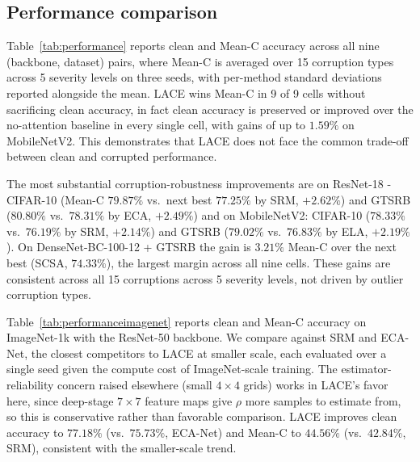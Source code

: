 \documentclass{bmvc2k}
\begin{document}

\subsection{Performance comparison}

Table~\ref{tab:performance} reports clean and Mean-C accuracy across all nine (backbone, dataset) pairs, where Mean-C is averaged over 15 corruption types across 5 severity levels on three seeds, with per-method standard deviations reported alongside the mean. LACE wins Mean-C in 9 of 9 cells without sacrificing clean accuracy, in fact clean accuracy is preserved or improved over the no-attention baseline in every single cell, with gains of up to $1.59\%$ on MobileNetV2. This demonstrates that LACE does not face the common trade-off between clean and corrupted performance.

The most substantial corruption-robustness improvements are on ResNet-18 - CIFAR-10 (Mean-C $79.87\%$ vs.\ next best $77.25\%$ by SRM, $+2.62\%$) and GTSRB ($80.80\%$ vs.\ $78.31\%$ by ECA, $+2.49\%$) and on MobileNetV2: CIFAR-10 ($78.33\%$ vs.\ $76.19\%$ by SRM, $+2.14\%$) and GTSRB ($79.02\%$ vs.\ $76.83\%$ by ELA, $+2.19\%$). On DenseNet-BC-100-12 + GTSRB the gain is $3.21\%$ Mean-C over the next best (SCSA, $74.33\%$), the largest margin across all nine cells. These gains are consistent across all 15 corruptions across 5 severity levels, not driven by outlier corruption types. 

Table~\ref{tab:performanceimagenet} reports clean and Mean-C accuracy on ImageNet-1k with the ResNet-50 backbone. We compare against SRM and ECA-Net, the closest competitors to LACE at smaller scale, each evaluated over a single seed given the compute cost of ImageNet-scale training. The estimator-reliability concern raised elsewhere (small $4{\times}4$ grids) works in LACE's favor here, since deep-stage $7{\times}7$ feature maps give $\rho$ more samples to estimate from, so this is conservative rather than favorable comparison. LACE improves clean accuracy to $77.18\%$ (vs.\ $75.73\%$, ECA-Net) and Mean-C to $44.56\%$ (vs.\ $42.84\%$, SRM), consistent with the smaller-scale trend.
\end{document}
